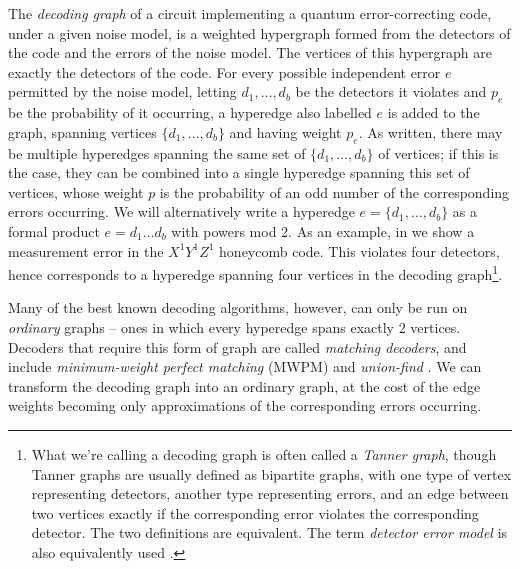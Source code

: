 The \textit{decoding graph} of a circuit implementing a quantum error-correcting code, under a given noise model, is a weighted hypergraph formed from the detectors of the code and the errors of the noise model.
The vertices of this hypergraph are exactly the detectors of the code.
For every possible independent error $e$ permitted by the noise model, letting $d_1, \ldots, d_b$ be the detectors it violates
and $p_e$ be the probability of it occurring,
a hyperedge also labelled $e$ is added to the graph, spanning vertices $\{d_1, \ldots, d_b\}$ and having weight $p_e$.
As written, there may be multiple hyperedges spanning the same set of $\{d_1, \ldots , d_b\}$ of vertices;
if this is the case, they can be combined into a single hyperedge spanning this set of vertices,
whose weight $p$ is the probability of an odd number of the corresponding errors occurring.
We will alternatively write a hyperedge $e = \{d_1, \ldots, d_b\}$ as a formal product $e = d_1 \ldots d_b$ with powers mod 2.
As an example, in  we show a measurement error in the $X^1Y^1Z^1$ honeycomb code.
This violates four detectors, hence corresponds to a hyperedge spanning four vertices in the decoding graph\footnote{What we're calling a decoding graph is often called a \textit{Tanner graph}, though Tanner graphs are usually defined as bipartite graphs, with one type of vertex representing detectors, another type representing errors, and an edge between two vertices exactly if the corresponding error violates the corresponding detector.
The two definitions are equivalent. The term \textit{detector error model} is also equivalently used \cite{gidney2022stim_error_model}.}.

Many of the best known decoding algorithms, however, can only be run on \textit{ordinary} graphs --
ones in which every hyperedge spans exactly $2$ vertices.
Decoders that require this form of graph are called \textit{matching decoders},
and include \textit{minimum-weight perfect matching} (MWPM)
\cite{MWPM,dennis2002topological,MWPMColor}
and \textit{union-find} \cite{PhysRevResearch.2.033042,UnionFind}.
We can transform the decoding graph into an ordinary graph, at the cost of the edge weights becoming only approximations of the corresponding errors occurring.

